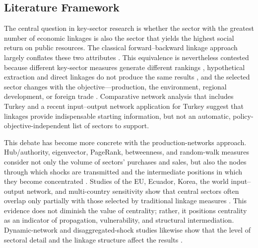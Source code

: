 % 

\subsection{Literature Framework}
\label{sec:literature-framework}

The central question in key-sector research is whether the sector with the greatest number of economic linkages is also the sector that yields the highest social return on public resources. The classical forward--backward linkage approach largely conflates these two attributes \citep{ref-hirschman1958,ref-rasmussen1956,ref-chenery-watanabe1958}. This equivalence is nevertheless contested because different key-sector measures generate different rankings \citep{ref-temurshoev-oosterhaven2014}, hypothetical extraction and direct linkages do not produce the same results \citep{ref-pereira-lopez2021,ref-bhusal2025}, and the selected sector changes with the objective---production, the environment, regional development, or foreign trade \citep{ref-alcantara-padilla2020,ref-ernawati2024,ref-ojaleye-narayanan2022,ref-nugroho2021}. Comparative network analysis that includes Turkey \citep{ref-jahangard-keshtvarz2012} and a recent input--output network application for Turkey \citep{ref-cirpici2024} suggest that linkages provide indispensable starting information, but not an automatic, policy-objective-independent list of sectors to support.

This debate has become more concrete with the production-networks approach. Hub/authority, eigenvector, PageRank, betweenness, and random-walk measures consider not only the volume of sectors' purchases and sales, but also the nodes through which shocks are transmitted and the intermediate positions in which they become concentrated \citep{ref-alatriste2015,ref-alatriste-lugo2022,ref-depaolis2022,ref-an2024}. Studies of the EU, Ecuador, Korea, the world input--output network, and multi-country sensitivity show that central sectors often overlap only partially with those selected by traditional linkage measures \citep{ref-ramirez-alvarez2023,ref-lee-ishiro2025,ref-tran2017,ref-wirkierman2021}. This evidence does not diminish the value of centrality; rather, it positions centrality as an indicator of propagation, vulnerability, and structural intermediation. Dynamic-network and disaggregated-shock studies likewise show that the level of sectoral detail and the linkage structure affect the results \citep{ref-guerrieri2014,ref-roson-sartori2016,ref-jiang2024,ref-kharazi2025}.

